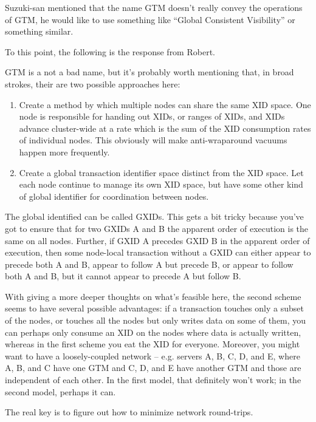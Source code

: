 	Suzuki-san mentioned that the name GTM doesn't really convey
	the operations of GTM, he would like to use something like
	``Global Consistent Visibility'' or something similar. 

	To this point, the following is the response from Robert.

	GTM is a not a bad name, but it's probably worth mentioning that,
	in broad strokes, their are two possible approaches here:

	\begin{enumerate}
		\item Create a method by which multiple nodes can share
			  the same XID space. One node is responsible for handing
			  out XIDs, or ranges of XIDs,
			  and XIDs advance cluster-wide at a rate which is the sum
			  of the XID consumption rates of individual nodes.
			  This obviously will make anti-wraparound vacuums happen
			  more frequently.
		\item Create a global transaction identifier space distinct
			  from the XID space.
			  Let each node continue to manage its own XID space,
			  but have some other kind of global identifier for
			  coordination between nodes.
	\end{enumerate}

	The global identified can be called GXIDs.
	This gets a bit tricky because you've got to ensure that for two GXIDs
	A and B the apparent order of execution is the same on all nodes.
	Further, if GXID A precedes GXID B in the apparent order of execution,
	then some node-local transaction without a GXID can either appear to
	precede both A and B, appear to follow A but precede B,
	or appear to follow both A and B, but it cannot appear to precede A but follow B.

	With giving a more deeper thoughts on what's feasible here,
	the second scheme seems to have several possible advantages:
	if a transaction touches only a subset of the nodes, or touches
	all the nodes but only writes data on some of them,
	you can perhaps only consume an XID on the nodes where data is actually written,
	whereas in the first scheme you eat the XID for everyone.
	Moreover, you might want to have a loosely-coupled network
	-- e.g.{} servers A, B, C, D, and E, where A, B, and C have one GTM and
	C, D, and E have another GTM and those are independent of each other.
	In the first model, that definitely won't work; in the second model, perhaps it can.


	The real key is to figure out how to minimize network round-trips.

